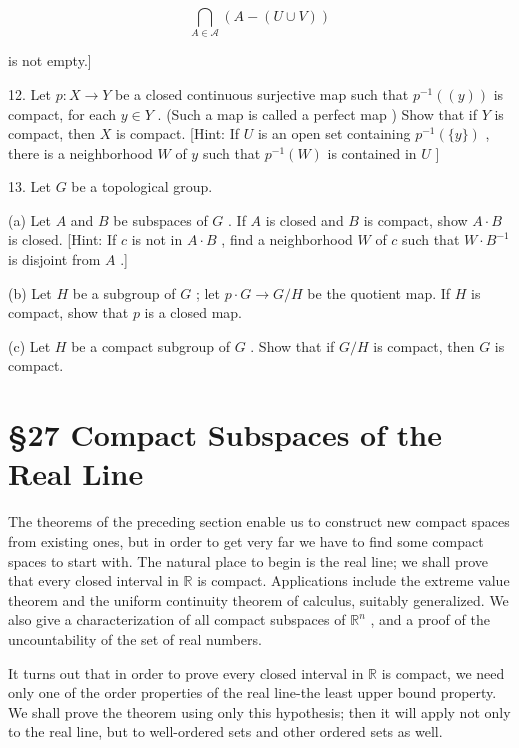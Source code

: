 \documentclass[10pt]{article}
\begin{document}
\[
\mathop{\bigcap }\limits_{{A \in  \mathcal{A}}}\left( {A - \left( {U \cup  V}\right) }\right)
\]

is not empty.]

12. Let \(p : X \rightarrow  Y\) be a closed continuous surjective map such that \({p}^{-1}\left( \left( y\right) \right)\) is compact, for each \(y \in  Y\) . (Such a map is called a perfect map ) Show that if \(Y\) is compact, then \(X\) is compact. [Hint: If \(U\) is an open set containing \({p}^{-1}\left( {\{ y\} }\right)\) , there is a neighborhood \(W\) of \(y\) such that \({p}^{-1}\left( W\right)\) is contained in \(U\) ]

13. Let \(G\) be a topological group.

(a) Let \(A\) and \(B\) be subspaces of \(G\) . If \(A\) is closed and \(B\) is compact, show \(A \cdot  B\) is closed. [Hint: If \(c\) is not in \(A \cdot  B\) , find a neighborhood \(W\) of \(c\) such that \(W \cdot  {B}^{-1}\) is disjoint from \(A\) .]

(b) Let \(H\) be a subgroup of \(G\) ; let \(p \cdot  G \rightarrow  G/H\) be the quotient map. If \(H\) is compact, show that \(p\) is a closed map.

(c) Let \(H\) be a compact subgroup of \(G\) . Show that if \(G/H\) is compact, then \(G\) is compact.

\section*{§27 Compact Subspaces of the Real Line}

The theorems of the preceding section enable us to construct new compact spaces from existing ones, but in order to get very far we have to find some compact spaces to start with. The natural place to begin is the real line; we shall prove that every closed interval in \(\mathbb{R}\) is compact. Applications include the extreme value theorem and the uniform continuity theorem of calculus, suitably generalized. We also give a characterization of all compact subspaces of \({\mathbb{R}}^{n}\) , and a proof of the uncountability of the set of real numbers.

It turns out that in order to prove every closed interval in \(\mathbb{R}\) is compact, we need only one of the order properties of the real line-the least upper bound property. We shall prove the theorem using only this hypothesis; then it will apply not only to the real line, but to well-ordered sets and other ordered sets as well.
\end{document}
